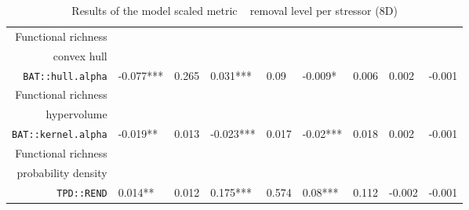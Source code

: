 \begin{table}[ht]
\begin{tabular}{rllllllll}
  Functional richness\\convex hull\\\texttt{BAT::hull.alpha} & -0.077*** & 0.265 & 0.031*** & 0.09 & -0.009* & 0.006 & 0.002 & -0.001 \\ 
  Functional richness\\hypervolume\\\texttt{BAT::kernel.alpha} & -0.019** & 0.013 & -0.023*** & 0.017 & -0.02*** & 0.018 & 0.002 & -0.001 \\ 
  Functional richness\\probability density\\\texttt{TPD::REND} & 0.014** & 0.012 & 0.175*** & 0.574 & 0.08*** & 0.112 & -0.002 & -0.001 \\ 
   \hline
\end{tabular}
\caption{Results of the model scaled metric ~ removal level per stressor (8D)} 
\end{table}

